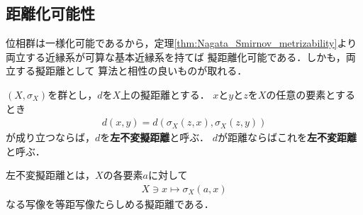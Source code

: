 \subsection{距離化可能性}
	位相群は一様化可能であるから，定理\ref{thm:Nagata_Smirnov_metrizability}より
	両立する近縁系が可算な基本近縁系を持てば
	擬距離化可能である．しかも，両立する擬距離として
	算法と相性の良いものが取れる．
	
	\begin{screen}
		\begin{dfn}[左不変距離]
			$\left(X,\sigma_X\right)$を群とし，$d$を$X$上の擬距離とする．
			$x$と$y$と$z$を$X$の任意の要素とするとき
			\begin{align}
				d\left(x,y\right) = d\left(\sigma_X\left(z,x\right),\sigma_X\left(z,y\right)\right)
			\end{align}
			が成り立つならば，$d$を{\bf 左不変擬距離}と呼ぶ．
			$d$が距離ならばこれを{\bf 左不変距離}と呼ぶ．
		\end{dfn}
	\end{screen}
	
	左不変擬距離とは，$X$の各要素$a$に対して
	\begin{align}
		X \ni x \longmapsto \sigma_X(a,x)
	\end{align}
	なる写像を等距写像たらしめる擬距離である．